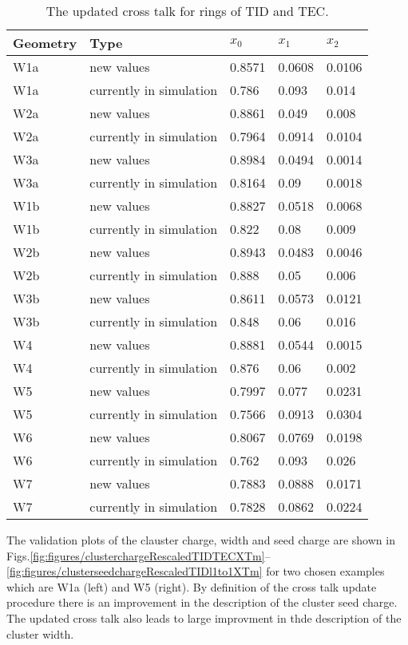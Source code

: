 \begin{table}[h]
\begin{center}
\begin{tabular}{|l|l|l|l|l|}
\hline
Geometry & Type & $x_{0}$ & $x_{1}$ & $x_{2}$ \\
\hline
\hline
W1a &  new values & 0.8571 & 0.0608 & 0.0106 \\
W1a &  currently in simulation & 0.786 & 0.093 & 0.014 \\
\hline
W2a &  new values & 0.8861 & 0.049 & 0.008 \\
W2a &  currently in simulation & 0.7964 & 0.0914 & 0.0104 \\
\hline
W3a &  new values & 0.8984 & 0.0494 & 0.0014 \\
W3a &  currently in simulation & 0.8164 & 0.09 & 0.0018 \\
\hline
W1b &  new values & 0.8827 & 0.0518 & 0.0068 \\
W1b &  currently in simulation & 0.822 & 0.08 & 0.009 \\
\hline
W2b &  new values & 0.8943 & 0.0483 & 0.0046 \\
W2b &  currently in simulation & 0.888 & 0.05 & 0.006 \\
\hline
W3b &  new values & 0.8611 & 0.0573 & 0.0121 \\
W3b &  currently in simulation & 0.848 & 0.06 & 0.016 \\
\hline
W4 &  new values & 0.8881 & 0.0544 & 0.0015 \\
W4 &  currently in simulation & 0.876 & 0.06 & 0.002 \\
\hline
W5 &  new values & 0.7997 & 0.077 & 0.0231 \\
W5 &  currently in simulation & 0.7566 & 0.0913 & 0.0304 \\
\hline
W6 &  new values & 0.8067 & 0.0769 & 0.0198 \\
W6 &  currently in simulation & 0.762 & 0.093 & 0.026 \\
\hline
W7 &  new values & 0.7883 & 0.0888 & 0.0171 \\
W7 &  currently in simulation & 0.7828 & 0.0862 & 0.0224 \\
\hline
\end{tabular}
\caption[Table caption text]{The updated cross talk for rings of TID and TEC. }
\label{tab:measuredXtalkTODTEC}
\end{center}
\end{table}


The validation plots of the clauster charge, width and seed charge are shown in Figs.\ref{fig:figures/clusterchargeRescaledTIDTECXTm}--\ref{fig:figures/clusterseedchargeRescaledTIDl1to1XTm} for two chosen examples which are W1a (left) and W5 (right). By definition of the cross talk update procedure there is an improvement in the description of the cluster seed charge. The updated cross talk also leads to large improvment in thde description of the cluster width.

